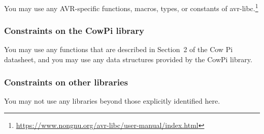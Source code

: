 You may use any AVR-specific functions, macros, types, or constants of avr-libc.\footnote{
    \url{https://www.nongnu.org/avr-libc/user-manual/index.html}
}

\subsubsection{Constraints on the CowPi library}

You may use any functions that are described in Section~2 of the Cow Pi datasheet,
and you may use any data structures provided by the CowPi library.

\subsubsection{Constraints on other libraries}

You may not use any libraries beyond those explicitly identified here.